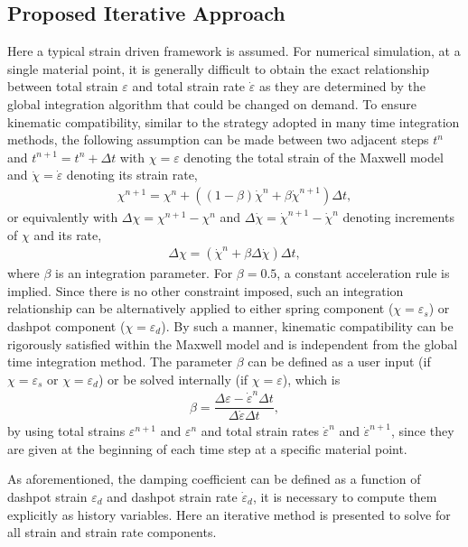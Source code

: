 \subsection{Proposed Iterative Approach}
Here a typical strain driven framework is assumed. For numerical simulation, at a single material point, it is generally difficult to obtain the exact relationship between total strain $\varepsilon$ and total strain rate $\dot\varepsilon$ as they are determined by the global integration algorithm that could be changed on demand. To ensure kinematic compatibility, similar to the strategy adopted in many time integration methods, the following assumption can be made between two adjacent steps $t^n$ and $t^{n+1}=t^n+\Delta{}t$ with $\chi=\varepsilon$ denoting the total strain of the Maxwell model and $\dot\chi=\dot\varepsilon$ denoting its strain rate,
\begin{gather}
\chi^{n+1}=\chi^n+\left(\left(1-\beta\right)\dot\chi^n+\beta\dot\chi^{n+1}\right)\Delta{}t,
\end{gather}
or equivalently with $\Delta\chi=\chi^{n+1}-\chi^n$ and $\Delta\dot\chi=\dot\chi^{n+1}-\dot\chi^n$ denoting increments of $\chi$ and its rate,
\begin{gather}\label{eq:newmark2}
\Delta\chi=\left(\dot\chi^n+\beta\Delta\dot\chi\right)\Delta{}t,
\end{gather}
where $\beta$ is an integration parameter. For $\beta=0.5$, a constant acceleration rule is implied. Since there is no other constraint imposed, such an integration relationship can be alternatively applied to either spring component ($\chi=\varepsilon_s$) or dashpot component ($\chi=\varepsilon_d$). By such a manner, kinematic compatibility can be rigorously satisfied within the Maxwell model and is independent from the global time integration method. The parameter $\beta$ can be defined as a user input (if $\chi=\varepsilon_s$ or $\chi=\varepsilon_d$) or be solved internally (if $\chi=\varepsilon$), which is
\begin{gather}\label{eq:delta}
\beta=\dfrac{\Delta\varepsilon-\dot\varepsilon^n\Delta{}t}{\Delta\dot\varepsilon\Delta{}t},
\end{gather}
by using total strains $\varepsilon^{n+1}$ and $\varepsilon^n$ and total strain rates $\dot\varepsilon^n$ and $\dot\varepsilon^{n+1}$, since they are given at the beginning of each time step at a specific material point.

As aforementioned, the damping coefficient can be defined as a function of dashpot strain $\varepsilon_d$ and dashpot strain rate $\dot\varepsilon_d$, it is necessary to compute them explicitly as history variables. Here an iterative method is presented to solve for all strain and strain rate components.

